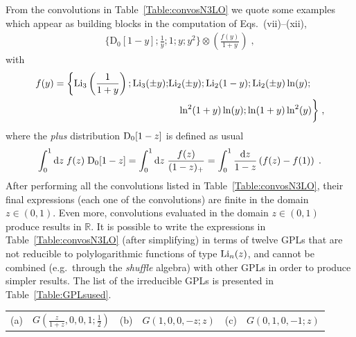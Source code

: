\documentclass[12pt]{article}
\DeclareRobustCommand{\nn}{\nonumber}
\DeclareRobustCommand{\rd}{\ensuremath{\mathrm{d}}}
\begin{document}
\begin{appendix}
From the convolutions in Table~\ref{Table:convosN3LO} we quote some  examples which appear as building blocks in the computation of Eqs.~(vii)--(xii),
\begin{align}
  \bigg\{\mathrm{D}_{0}[1-y];\frac{1}{y};1;y;y^{2}\bigg\} \otimes \left( \frac{f(y)}{1+y} \right) \;,
\end{align}
with 
\begin{align}
  f(y) =
  \bigg\{{\rm Li}_{3}\left(\frac{1}{1+y}\right); {\rm Li}_{3}(\pm y); 
  & {\rm Li}_{2}(\pm y); {\rm Li}_{2}(1- y); {\rm Li}_{2}(\pm y) \ln(y);
  \nn\\&\quad
  \ln^{2}(1+y)\ln(y);\ln(1+y)\ln^{2}(y)\bigg\} \;,
\end{align}
where the \textit{plus} distribution ${\rm D}_{0}[1-z]$ is defined as usual 
\begin{align}
  \int^{1}_{0}\rd z \; f(z) \; {\rm D}_{0}[1-z] =\int^{1}_{0}\rd z \; \frac{f(z)}{(1-z)_{+}} = \int^{1}_{0}\frac{\rd z}{1-z}\left( f(z)-f(1)\right) \;.
\end{align}
After performing all the convolutions listed in Table~\ref{Table:convosN3LO}, their final expressions (each one of the convolutions) are finite in the domain $z\in (0,1)$. Even more, convolutions evaluated in the domain $z\in (0,1)$ produce results in $\mathbb{R}$. It is possible to write the expressions in Table~\ref{Table:convosN3LO} (after simplifying) in terms of twelve GPLs that are not reducible to polylogarithmic functions of type ${\rm Li}_n(z)$, 
 and cannot be combined (e.g.\ through the \textit{shuffle} algebra) with other GPLs in order to produce simpler results. 
The list of the irreducible GPLs is presented in Table~\ref{Table:GPLsused}.
\begin{table}
\begin{center}
\renewcommand{\arraystretch}{1.5}
\begin{tabular}{ |c|c||c|c||c|c| }
\hline
\multirow{1}{*}{(a)} 

& $G(\frac{z}{1+z},0,0,1;\frac{1}{2})$

& \multirow{1}{*}{(b)} 

& $G(1,0,0,-z;z)$ 

& \multirow{1}{*}{(c)} 

& $G(0,1,0,-1;z)$  \\


\end{tabular}
\end{center}
\end{table}
\end{appendix}
\end{document}
